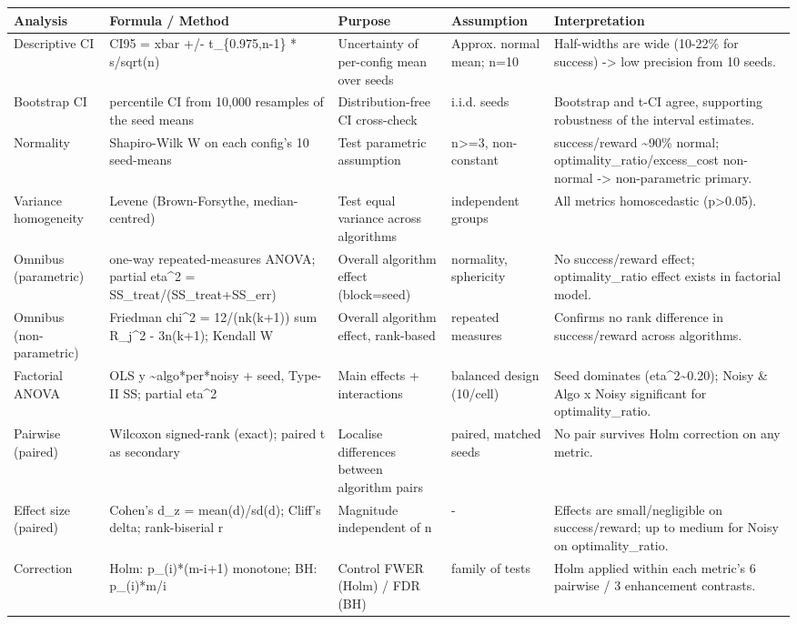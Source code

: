 \begin{tabular}{lllll}
\toprule
Analysis & Formula / Method & Purpose & Assumption & Interpretation \\
\midrule
Descriptive CI & CI95 = xbar +/- t\_\{0.975,n-1\} * s/sqrt(n) & Uncertainty of per-config mean over seeds & Approx. normal mean; n=10 & Half-widths are wide (10-22\% for success) -> low precision from 10 seeds. \\
Bootstrap CI & percentile CI from 10,000 resamples of the seed means & Distribution-free CI cross-check & i.i.d. seeds & Bootstrap and t-CI agree, supporting robustness of the interval estimates. \\
Normality & Shapiro-Wilk W on each config's 10 seed-means & Test parametric assumption & n>=3, non-constant & success/reward \textasciitilde 90\% normal; optimality\_ratio/excess\_cost non-normal -> non-parametric primary. \\
Variance homogeneity & Levene (Brown-Forsythe, median-centred) & Test equal variance across algorithms & independent groups & All metrics homoscedastic (p>0.05). \\
Omnibus (parametric) & one-way repeated-measures ANOVA; partial eta\textasciicircum 2 = SS\_treat/(SS\_treat+SS\_err) & Overall algorithm effect (block=seed) & normality, sphericity & No success/reward effect; optimality\_ratio effect exists in factorial model. \\
Omnibus (non-parametric) & Friedman chi\textasciicircum 2 = 12/(nk(k+1)) sum R\_j\textasciicircum 2 - 3n(k+1); Kendall W & Overall algorithm effect, rank-based & repeated measures & Confirms no rank difference in success/reward across algorithms. \\
Factorial ANOVA & OLS y \textasciitilde \space algo*per*noisy + seed, Type-II SS; partial eta\textasciicircum 2 & Main effects + interactions & balanced design (10/cell) & Seed dominates (eta\textasciicircum 2\textasciitilde 0.20); Noisy \& Algo x Noisy significant for optimality\_ratio. \\
Pairwise (paired) & Wilcoxon signed-rank (exact); paired t as secondary & Localise differences between algorithm pairs & paired, matched seeds & No pair survives Holm correction on any metric. \\
Effect size (paired) & Cohen's d\_z = mean(d)/sd(d); Cliff's delta; rank-biserial r & Magnitude independent of n & - & Effects are small/negligible on success/reward; up to medium for Noisy on optimality\_ratio. \\
Correction & Holm: p\_(i)*(m-i+1) monotone; BH: p\_(i)*m/i & Control FWER (Holm) / FDR (BH) & family of tests & Holm applied within each metric's 6 pairwise / 3 enhancement contrasts. \\
\bottomrule
\end{tabular}
